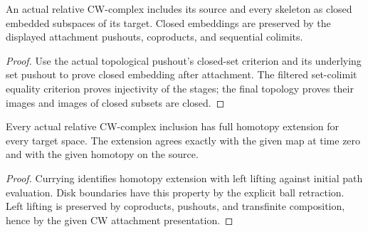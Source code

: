 \begin{proposition}
  \label{prop:relative-cw-closed-embedding}
  \leanok
  An actual relative CW-complex includes its source and every skeleton as closed embedded subspaces of its target. Closed embeddings are preserved by the displayed attachment pushouts, coproducts, and sequential colimits.
\end{proposition}
\begin{proof}
  Use the actual topological pushout's closed-set criterion and its underlying set pushout to prove closed embedding after attachment. The filtered set-colimit equality criterion proves injectivity of the stages; the final topology proves their images and images of closed subsets are closed.
  \leanok
\end{proof}

\begin{proposition}
  \label{prop:relative-cw-homotopy-extension}
  \leanok
  Every actual relative CW-complex inclusion has full homotopy extension for every target space. The extension agrees exactly with the given map at time zero and with the given homotopy on the source.
\end{proposition}
\begin{proof}
  Currying identifies homotopy extension with left lifting against initial path evaluation. Disk boundaries have this property by the explicit ball retraction. Left lifting is preserved by coproducts, pushouts, and transfinite composition, hence by the given CW attachment presentation.
  \leanok
\end{proof}

